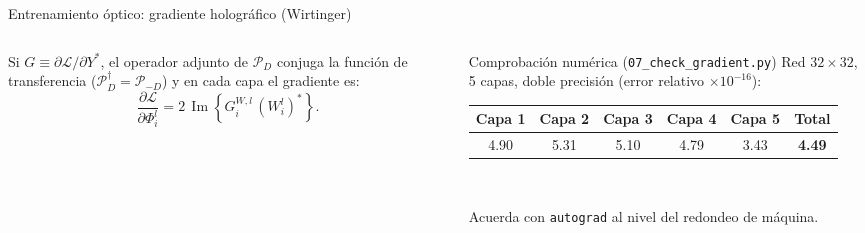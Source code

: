\documentclass[aspectratio=169,10pt]{beamer}
\newcommand{\Imag}{\operatorname{Im}}
\begin{document}
\begin{frame}{Entrenamiento óptico: gradiente holográfico (Wirtinger)}
\vspace{4pt}
\begin{columns}[T,onlytextwidth]
  \begin{column}{0.46\textwidth}
    \begin{destacado}
      \scriptsize
      Si $G\equiv\partial\mathcal{L}/\partial Y^*$, el operador adjunto de $\mathcal{P}_D$ conjuga la función de transferencia ($\mathcal{P}_D^\dagger=\mathcal{P}_{-D}$) y en cada capa el gradiente es:
      \[
        \frac{\partial\mathcal{L}}{\partial\Phi_i^l}=2\,\Imag\!\left\{G_i^{W,l}\,(W_i^l)^*\right\}.
      \]
    \end{destacado}
  \end{column}
  \begin{column}{0.52\textwidth}
    \begin{caja}{Comprobación numérica (\texttt{07\_check\_gradient.py})}
      \scriptsize
      Red $32\times 32$, 5 capas, doble precisión (error relativo $\times 10^{-16}$):\\[2pt]
      \centering\scriptsize\setlength{\tabcolsep}{4pt}
      \begin{tabular}{@{}cccccc@{}}
        \toprule
        Capa 1 & Capa 2 & Capa 3 & Capa 4 & Capa 5 & Total\\
        \midrule
        4.90 & 5.31 & 5.10 & 4.79 & 3.43 & \textbf{4.49}\\
        \bottomrule
      \end{tabular}\\[2pt]
      \raggedright\scriptsize Acuerda con \texttt{autograd} al nivel del redondeo de máquina.
    \end{caja}
  \end{column}
\end{columns}
\end{frame}
\end{document}
